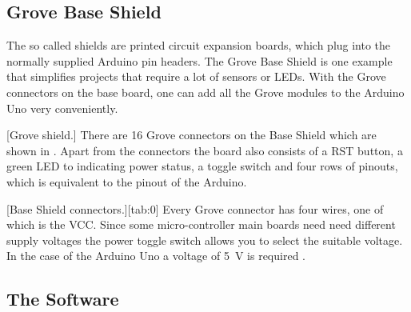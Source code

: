 \subsection{Grove Base Shield}\label{sec:grove}
The so called shields are printed circuit expansion boards, which plug into the normally supplied Arduino pin headers. The Grove Base Shield is one example that simplifies projects that require a lot of sensors or LEDs. With the Grove connectors on the base board, one can add all the Grove modules to the Arduino Uno very conveniently.\par
%
[Grove shield.]
%
There are 16 Grove connectors on the Base Shield which are shown in . Apart from the connectors the board also consists of a \ac{RST} button, a green LED to indicating power status, a toggle switch and four rows of pinouts, which is equivalent to the pinout of the Arduino.\par
%
[Base Shield connectors.][tab:0]
%
Every Grove connector has four wires, one of which is the \ac{VCC}. Since some micro-controller main boards need need different supply voltages the power toggle switch allows you to select the suitable voltage. In the case of the Arduino Uno a voltage of \SI{5}{\V} is required \cite{grove:1}.
%
\subsection{The Software}\label{sec:soft}
%
